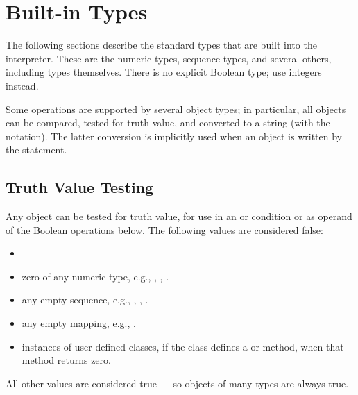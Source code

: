 \section{Built-in Types \label{types}}

The following sections describe the standard types that are built into
the interpreter.  These are the numeric types, sequence types, and
several others, including types themselves.  There is no explicit
Boolean type; use integers instead.

Some operations are supported by several object types; in particular,
all objects can be compared, tested for truth value, and converted to
a string (with the  notation).  The latter
conversion is implicitly used when an object is written by the
 statement.


\subsection{Truth Value Testing \label{truth}}

Any object can be tested for truth value, for use in an  or
 condition or as operand of the Boolean operations below.
The following values are considered false:

\begin{itemize}

\item	{}

\item	zero of any numeric type, e.g., , , .

\item	any empty sequence, e.g., , \code{()}, \code{[]}.

\item	any empty mapping, e.g., \code{\{\}}.

\item	instances of user-defined classes, if the class defines a
	 or  method, when that
	method returns zero.

\end{itemize}

All other values are considered true --- so objects of many types are
always true.

